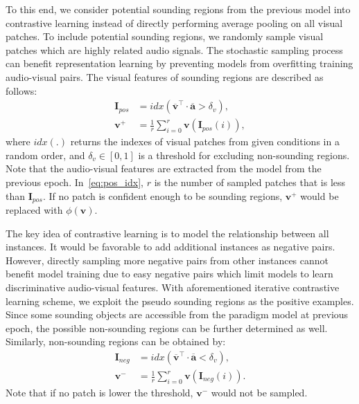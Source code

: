 To this end, we consider potential sounding regions from the previous model into contrastive learning instead of directly performing average pooling on all visual patches. 
% 
To include potential sounding regions, we randomly sample visual patches which are highly related audio signals.
%
The stochastic sampling process can benefit representation learning by preventing models from overfitting training audio-visual pairs.
%
The visual features of sounding regions are described as follows:  
\begin{equation}
\begin{aligned}
\label{eq:pos_idx}
\mathbf{I}_{pos} &= idx(\overline{\mathbf{v}}^{\top} \cdot \overline{\mathbf{a}} > \delta_{v}), \\
\mathbf{v}^{+}&= \frac{1}{r}  \sum_{i=0}^{r} \mathbf{v}(\mathbf {I}_{pos}(i)),
\end{aligned}
\end{equation}
where $idx(.)$ returns the indexes of visual patches from given conditions in a random order, and $\delta_{v} \in [0,1]$ is a threshold for excluding non-sounding regions. 
% 
Note that the audio-visual features are extracted from the model from the previous epoch. 
% 
In~\eqref{eq:pos_idx}, $r$ is the number of sampled patches that is less than  $\mathbf{I}_{pos}$.
% 
If no patch is confident enough to be sounding regions, $\mathbf{v}^{+}$ would be replaced with $\phi(\mathbf{v})$.


% 
The key idea of contrastive learning is to model the relationship between all instances.
% 
It would be favorable to add additional instances as negative pairs. 
% 
However, directly sampling more negative pairs from other instances cannot benefit model training due to easy negative pairs which limit models to learn discriminative audio-visual features. 
% 
With aforementioned iterative contrastive learning scheme, we exploit the pseudo sounding regions as the positive examples. 
% 
Since some sounding objects are accessible from the paradigm model at previous epoch, the possible non-sounding regions can be further determined as well.
% 
Similarly, non-sounding regions can be obtained by:
\begin{equation}
\begin{aligned}
\label{eq:neg_idx}
\mathbf{I}_{neg} &= idx(\overline{\mathbf{v}}^{\top} \cdot \overline{\mathbf{a}} < \delta_{v}), \\
\mathbf{v}^{-}&= \frac{1}{r}  \sum_{i=0}^{r} \mathbf{v}(\mathbf {I}_{neg}(i)).
\end{aligned}
\end{equation}
Note that if no patch is lower the threshold, $\mathbf{v}^{-}$ would not be sampled.

